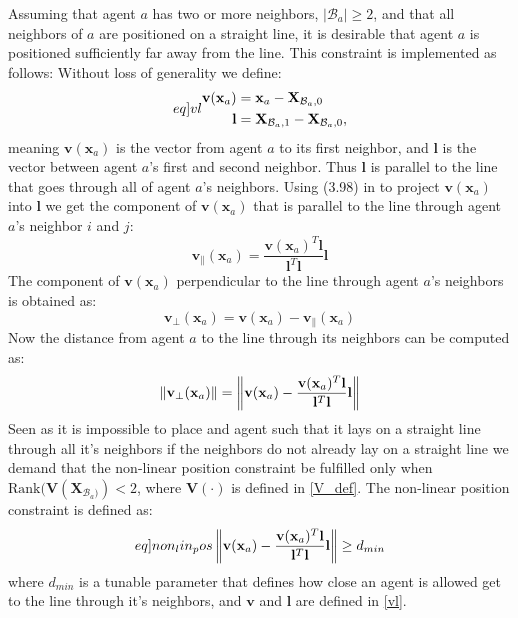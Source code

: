 Assuming that agent $a$ has two or more neighbors, $|\mathcal{B}_{a}|\geq 2$, and that all neighbors of $a$ are positioned on a straight line, it is desirable that agent $a$ is positioned sufficiently far away from the line. This constraint is implemented as follows:
Without loss of generality we define:
\begin{subequations}\label[eq]{vl}
  \begin{align}
    \mathbf{v}(\mathbf{x}_{a}) &= \mathbf{x}_{a} - \mathbf{X}_{\mathcal{B}_{a}, 0}\\
    \mathbf{l} &= \mathbf{X}_{\mathcal{B}_{a}, 1} - \mathbf{X}_{\mathcal{B}_{a}, 0},
  \end{align}
\end{subequations}
meaning $\mathbf{v}(\mathbf{x}_{a})$ is the vector from agent $a$ to its first neighbor, and $\mathbf{l}$ is the vector between agent $a$'s first and second neighbor. Thus $\mathbf{l}$ is parallel to the line 
that goes through all of agent $a$'s neighbors.
Using (3.98) in \cite{projection} to project $\mathbf{v}(\mathbf{x}_{a})$ into $\mathbf{l}$ we get the component of $\mathbf{v}(\mathbf{x}_{a})$ that is parallel to the line
through agent $a$'s neighbor $i$ and $j$:
\begin{equation}
  \mathbf{v}_{\parallel}(\mathbf{x}_{a}) = \frac{\mathbf{v}(\mathbf{x}_{a})^{T}\mathbf{l}}{\mathbf{l}^{T}\mathbf{l}}\mathbf{l}
\end{equation}
The component of $\mathbf{v}(\mathbf{x}_{a})$ perpendicular to the line through agent $a$'s
neighbors is obtained as:
\begin{equation}
  \mathbf{v}_{\perp}(\mathbf{x}_{a}) = \mathbf{v}(\mathbf{x}_{a}) - \mathbf{v}_{\parallel}(\mathbf{x}_{a})
\end{equation}
Now the distance from agent $a$ to the line through its neighbors can be computed as:
\begin{equation}
  \left\lVert\mathbf{v}_{\perp}(\mathbf{x}_{a})\right\rVert = \left\lVert\mathbf{v}(\mathbf{x}_{a}) - \frac{\mathbf{v}(\mathbf{x}_{a})^{T}\mathbf{l}}{\mathbf{l}^{T}\mathbf{l}}\mathbf{l}\right\rVert
\end{equation}
Seen as it is impossible to place and agent such that it lays on a straight line through all it's neighbors if the neighbors do not already
lay on a straight line we demand that the non-linear position constraint be fulfilled only when $\mathrm{Rank}(\mathbf{V}(\mathbf{X}_{\mathcal{B}_{a})}) < 2$, where $\mathbf{V}(\cdot)$ is defined in \eqref{V_def}. The non-linear position constraint is defined as:
\begin{equation}\label[eq]{non_lin_pos}
    \norm{\mathbf{v}(\mathbf{x}_{a}) - \frac{\mathbf{v}(\mathbf{x}_{a})^{T}\mathbf{l}}{\mathbf{l}^{T}\mathbf{l}}\mathbf{l}}\geq d_{min} 
\end{equation}
where $d_{min}$ is a tunable parameter that defines how close an agent is allowed get to the line through it's neighbors, and $\mathbf{v}$ and $\mathbf{l}$
are defined in \eqref{vl}.

